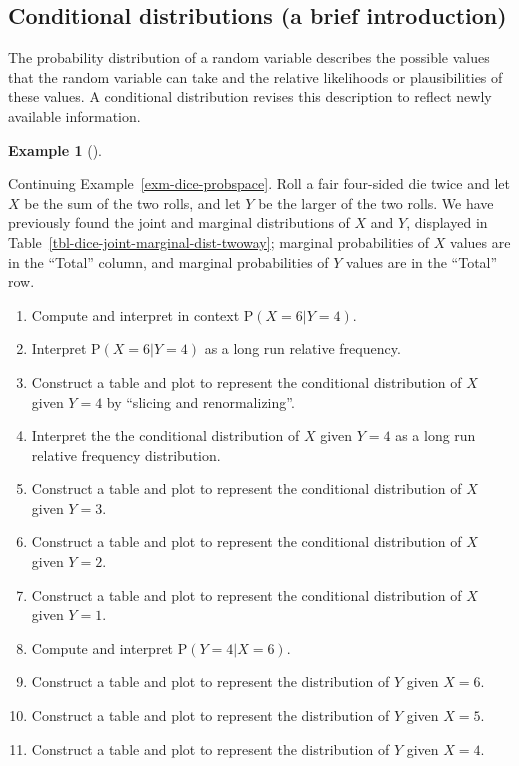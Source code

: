 \documentclass[
  letterpaper,
  DIV=11,
  numbers=noendperiod]{scrreprt}
\providecommand{\tightlist}{%
  \setlength{\itemsep}{0pt}\setlength{\parskip}{0pt}}
\theoremstyle{plain}
\theoremstyle{definition}
\newtheorem{example}{Example}[chapter]
\theoremstyle{definition}
\theoremstyle{definition}
\theoremstyle{remark}
\begin{document}
\subsection{Conditional distributions (a brief
introduction)}\label{conditional-distributions-a-brief-introduction}

The probability distribution of a random variable describes the possible
values that the random variable can take and the relative likelihoods or
plausibilities of these values. A conditional distribution revises this
description to reflect newly available information.

\begin{tcolorbox}[enhanced jigsaw, opacityback=0, left=2mm, colframe=quarto-callout-note-color-frame, toprule=.15mm, breakable, colback=white, leftrule=.75mm, arc=.35mm, rightrule=.15mm, bottomrule=.15mm]

\begin{example}[]\protect\hypertarget{exm-dice-conditional}{}\label{exm-dice-conditional}

Continuing Example~\ref{exm-dice-probspace}. Roll a fair four-sided die
twice and let \(X\) be the sum of the two rolls, and let \(Y\) be the
larger of the two rolls. We have previously found the joint and marginal
distributions of \(X\) and \(Y\), displayed in
Table~\ref{tbl-dice-joint-marginal-dist-twoway}; marginal probabilities
of \(X\) values are in the ``Total'' column, and marginal probabilities
of \(Y\) values are in the ``Total'' row.

\begin{enumerate}
\def\labelenumi{\arabic{enumi}.}
\tightlist
\item
  Compute and interpret in context \(\textrm{P}(X=6|Y=4)\).
\item
  Interpret \(\textrm{P}(X=6|Y=4)\) as a long run relative frequency.
\item
  Construct a table and plot to represent the conditional distribution
  of \(X\) given \(Y=4\) by ``slicing and renormalizing''.
\item
  Interpret the the conditional distribution of \(X\) given \(Y=4\) as a
  long run relative frequency distribution.
\item
  Construct a table and plot to represent the conditional distribution
  of \(X\) given \(Y=3\).
\item
  Construct a table and plot to represent the conditional distribution
  of \(X\) given \(Y=2\).
\item
  Construct a table and plot to represent the conditional distribution
  of \(X\) given \(Y=1\).
\item
  Compute and interpret \(\textrm{P}(Y=4|X=6)\).
\item
  Construct a table and plot to represent the distribution of \(Y\)
  given \(X=6\).
\item
  Construct a table and plot to represent the distribution of \(Y\)
  given \(X=5\).
\item
  Construct a table and plot to represent the distribution of \(Y\)
  given \(X=4\).
\end{enumerate}


\end{example}
\end{tcolorbox}
\end{document}
